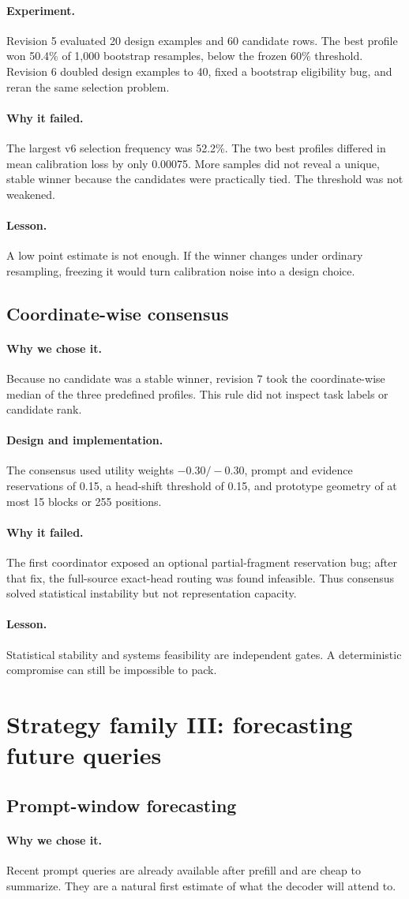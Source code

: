 \documentclass[11pt]{article}
\newcommand{\lesson}{\paragraph{Lesson.}}
\newcommand{\reason}{\paragraph{Why we chose it.}}
\newcommand{\design}{\paragraph{Design and implementation.}}
\newcommand{\experiment}{\paragraph{Experiment.}}
\newcommand{\failure}{\paragraph{Why it failed.}}
\begin{document}
\experiment
Revision 5 evaluated 20 design examples and 60 candidate rows.  The best profile won 50.4\% of
1,000 bootstrap resamples, below the frozen 60\% threshold.  Revision 6 doubled design examples to
40, fixed a bootstrap eligibility bug, and reran the same selection problem.

\failure
The largest v6 selection frequency was 52.2\%.  The two best profiles differed in mean calibration
loss by only 0.00075.  More samples did not reveal a unique, stable winner because the candidates
were practically tied.  The threshold was not weakened.

\lesson
A low point estimate is not enough.  If the winner changes under ordinary resampling, freezing it
would turn calibration noise into a design choice.

\subsection{Coordinate-wise consensus}

\reason
Because no candidate was a stable winner, revision 7 took the coordinate-wise median of the three
predefined profiles.  This rule did not inspect task labels or candidate rank.

\design
The consensus used utility weights $-0.30/-0.30$, prompt and evidence reservations of 0.15, a
head-shift threshold of 0.15, and prototype geometry of at most 15 blocks or 255 positions.

\failure
The first coordinator exposed an optional partial-fragment reservation bug; after that fix, the
full-source exact-head routing was found infeasible.  Thus consensus solved statistical
instability but not representation capacity.

\lesson
Statistical stability and systems feasibility are independent gates.  A deterministic compromise
can still be impossible to pack.

\section{Strategy family III: forecasting future queries}

\subsection{Prompt-window forecasting}

\reason
Recent prompt queries are already available after prefill and are cheap to summarize.  They are a
natural first estimate of what the decoder will attend to.
\end{document}
